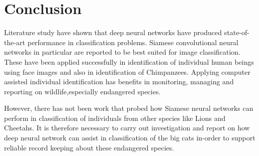 %
%
%

\chapter{Conclusion}
Literature study have shown that deep neural networks have produced state-of-the-art performance in classification problems. Siamese convolutional neural networks in  particular are reported to be best suited for image classification. These have been applied successfully in identification of individual human beings using face images and also in identification of Chimpanzees. Applying computer assisted individual identification has benefits in monitoring, managing and reporting on wildlife,especially endangered species.

However, there has not been work that probed how Siamese neural networks can perform in classification of individuals from other species like Lions and Cheetahs. It is therefore necessary to carry out investigation and report on how deep neural network can assist in classification of the big cats in-order to support reliable record keeping about these endangered species.  
